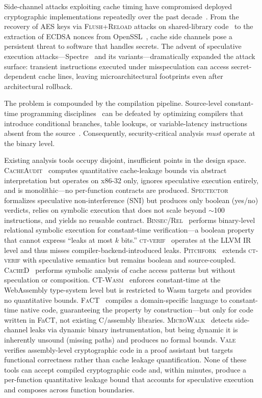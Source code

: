 \documentclass{article}
\theoremstyle{definition}
\theoremstyle{remark}
\newcommand{\CacheAudit}{\textsc{CacheAudit}}
\newcommand{\Spectector}{\textsc{Spectector}}
\newcommand{\BinsecRel}{\textsc{Binsec/Rel}}
\newcommand{\ctverif}{\textsc{ct-verif}}
\newcommand{\Pitchfork}{\textsc{Pitchfork}}
\newcommand{\CacheD}{\textsc{CacheD}}
\newcommand{\CTWasm}{\textsc{CT-Wasm}}
\newcommand{\MicroWalk}{\textsc{MicroWalk}}
\newcommand{\Vale}{\textsc{Vale}}
\newcommand{\FaCT}{\textsc{FaCT}}
\begin{document}
Side-channel attacks exploiting cache timing have compromised deployed
cryptographic implementations repeatedly over the past
decade~\cite{yarom2014flush,gruss2016flush,ge2018survey}.  From the
recovery of AES keys via \textsc{Flush+Reload} attacks on
shared-library code~\cite{yarom2014flush} to the extraction of ECDSA
nonces from OpenSSL~\cite{brumley2011remote}, cache side channels pose
a persistent threat to software that handles secrets.  The advent of
speculative execution attacks---Spectre~\cite{kocher2019spectre} and
its variants---dramatically expanded the attack surface: transient
instructions executed under misspeculation can access
secret-dependent cache lines, leaving microarchitectural footprints
even after architectural rollback.

The problem is compounded by the compilation pipeline.  Source-level
constant-time programming disciplines~\cite{bernstein2005poly1305}
can be defeated by optimizing compilers that introduce conditional
branches, table lookups, or variable-latency instructions absent from
the source~\cite{simon2018you,daniel2020binsecrel}.  Consequently,
security-critical analysis \emph{must} operate at the binary level.

Existing analysis tools occupy disjoint, insufficient points in the
design space.  \CacheAudit{}~\cite{doychev2015cacheaudit} computes
quantitative cache-leakage bounds via abstract interpretation but
operates on x86-32 only, ignores speculative execution entirely, and
is monolithic---no per-function contracts are produced.
\Spectector{}~\cite{guarnieri2020spectector} formalizes speculative
non-interference (SNI) but produces only boolean (yes/no) verdicts,
relies on symbolic execution that does not scale beyond
$\sim$100 instructions, and yields no reusable contract.
\BinsecRel{}~\cite{daniel2020binsecrel} performs binary-level
relational symbolic execution for constant-time verification---a
boolean property that cannot express ``leaks at most $k$ bits.''
\ctverif{}~\cite{almeida2016verifying} operates at the LLVM IR level
and thus misses compiler-backend-introduced leaks.
\Pitchfork{}~\cite{cauligi2020constant} extends \ctverif{} with
speculative semantics but remains boolean and source-coupled.
\CacheD{}~\cite{wang2017cached} performs symbolic analysis of cache
access patterns but without speculation or composition.
\CTWasm{}~\cite{watt2019ct} enforces constant-time at the WebAssembly
type-system level but is restricted to Wasm targets and provides no
quantitative bounds.  \FaCT{}~\cite{cauligi2019fact} compiles a
domain-specific language to constant-time native code, guaranteeing
the property by construction---but only for code written in FaCT, not
existing C/assembly libraries.  \MicroWalk{}~\cite{wichelmann2018microwalk}
detects side-channel leaks via dynamic binary instrumentation, but
being dynamic it is inherently unsound (missing paths) and produces no
formal bounds.  \Vale{}~\cite{bond2017vale} verifies assembly-level
cryptographic code in a proof assistant but targets functional
correctness rather than cache leakage quantification.
None of these tools can accept compiled cryptographic code and, within
minutes, produce a per-function quantitative leakage bound that accounts for
speculative execution and composes across function boundaries.
\end{document}
